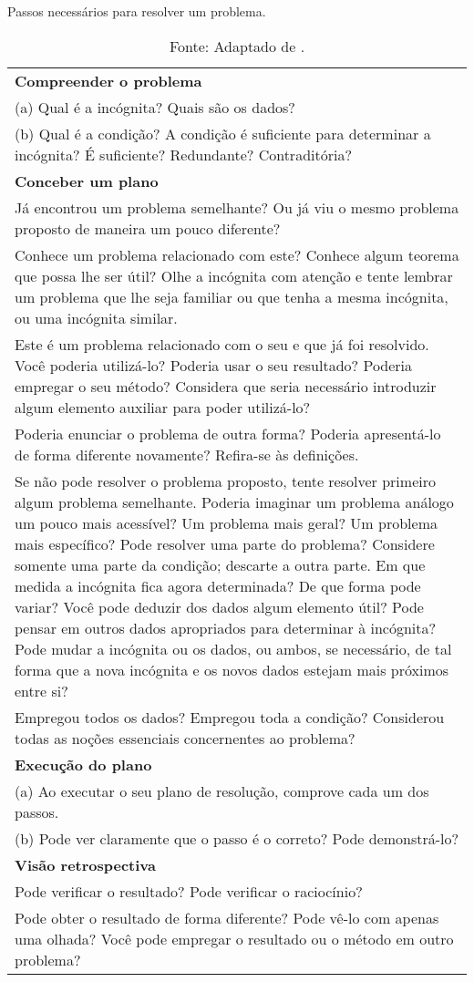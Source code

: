 \begin{table}[ht]
\caption{Passos necessários para resolver um problema.}
\label{tab:passos}
\begin{tabularx}{\textwidth}{@{}X@{}}
\toprule
\textbf{Compreender o problema} \\
(a) Qual é a incógnita? Quais são os dados? \\
(b) Qual é a condição? A condição é suficiente para determinar a incógnita? É suficiente? Redundante? Contraditória? \\
\midrule
\textbf{Conceber um plano} \\
Já encontrou um problema semelhante? Ou já viu o mesmo problema proposto de maneira um pouco diferente? \\
Conhece um problema relacionado com este? Conhece algum teorema que possa lhe ser útil? Olhe a incógnita com atenção e tente lembrar um problema que lhe seja familiar ou que tenha a mesma incógnita, ou uma incógnita similar. \\
Este é um problema relacionado com o seu e que já foi resolvido. Você poderia utilizá-lo? Poderia usar o seu resultado? Poderia empregar o seu método? Considera que seria necessário introduzir algum elemento auxiliar para poder utilizá-lo? \\
Poderia enunciar o problema de outra forma? Poderia apresentá-lo de forma diferente novamente? Refira-se às definições. \\
Se não pode resolver o problema proposto, tente resolver primeiro algum problema semelhante. Poderia imaginar um problema análogo um pouco mais acessível? Um problema mais geral? Um problema mais específico? Pode resolver uma parte do problema? Considere somente uma parte da condição; descarte a outra parte. Em que medida a incógnita fica agora determinada? De que forma pode variar? Você pode deduzir dos dados algum elemento útil? Pode pensar em outros dados apropriados para determinar à incógnita? Pode mudar a incógnita ou os dados, ou ambos, se necessário, de tal forma que a nova incógnita e os novos dados estejam mais próximos entre si? \\
Empregou todos os dados? Empregou toda a condição? Considerou todas as noções essenciais concernentes ao problema? \\
\midrule
\textbf{Execução do plano} \\
(a) Ao executar o seu plano de resolução, comprove cada um dos passos. \\
(b) Pode ver claramente que o passo é o correto? Pode demonstrá-lo? \\
\midrule
\textbf{Visão retrospectiva} \\
Pode verificar o resultado? Pode verificar o raciocínio? \\
Pode obter o resultado de forma diferente? Pode vê-lo com apenas uma olhada? Você pode empregar o resultado ou o método em outro problema? \\
\bottomrule
\end{tabularx}
\caption*{Fonte: Adaptado de .}
\end{table}



